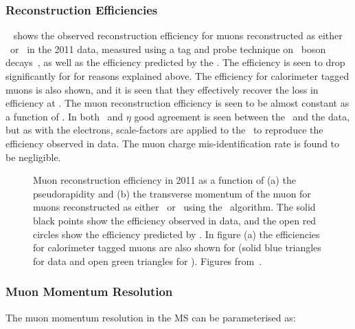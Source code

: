 \subsubsection{Reconstruction Efficiencies}

~ shows the observed reconstruction efficiency for muons
reconstructed as either \combined\ or \segmentTagged\ in the 2011 data, measured
using a tag and probe technique on \Z\ boson decays~\cite{ATLAS-CONF-2011-063},
as well as the efficiency predicted by the \mcsim. The
efficiency is seen to drop significantly for  for reasons
explained above. The efficiency for calorimeter tagged muons is also shown, and
it is seen that they effectively recover the loss in efficiency at
. The muon reconstruction efficiency is seen to be almost constant
as a function of \pt. In both \pt\ and $\eta$ good agreement is seen between the
\mcsim\ and the data, but as with the electrons, scale-factors are applied to
the \mc\ to reproduce the efficiency observed in data. 
The muon charge mis-identification rate is found to be negligible.

\begin{figure}[h]
\centering
    \caption[Muon reconstruction efficiency in 2011 as a function of the
    pseudorapidity and the transverse momentum of the muon.]{Muon
    reconstruction efficiency in 2011 as a function of (a) the pseudorapidity and
    (b) the transverse momentum of the muon for muons reconstructed as either
    \combined\ or \segmentTagged\ using the \staco\ algorithm. The solid black points
    show the efficiency observed in data, and the open red circles show the
    efficiency predicted by \mcsim. In figure (a) the efficiencies
    for calorimeter tagged muons are also shown for  (solid blue
    triangles for data and open green triangles for \mc). Figures
    from~\cite{MuonEfficiency2011}.} 
    \label{fig:mu-reco-eff} 
\end{figure}


\subsubsection{Muon Momentum Resolution}

The muon momentum resolution in the MS can be parameterised as:

